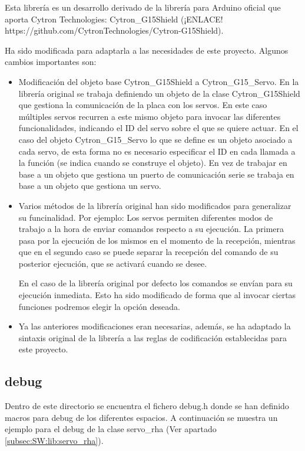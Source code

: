         Esta librería es un desarrollo derivado de la librería para Arduino oficial que aporta Cytron Technologies: Cytron_G15Shield (¡ENLACE! https://github.com/CytronTechnologies/Cytron-G15Shield).

        Ha sido modificada para adaptarla a las necesidades de este proyecto. Algunos cambios importantes son:

        \begin{itemize}
            \item Modificación del objeto base Cytron_G15Shield a Cytron_G15_Servo. En la librería original se trabaja definiendo un objeto de la clase Cytron_G15Shield que gestiona la comunicación de la placa con los servos. En este caso múltiples servos recurren a este mismo objeto para invocar las diferentes funcionalidades, indicando el ID del servo sobre el que se quiere actuar. En el caso del objeto Cytron_G15_Servo lo que se define es un objeto asociado a cada servo, de esta forma no es necesario especificar el ID en cada llamada a la función (se indica cuando se construye el objeto). En vez de trabajar en base a un objeto que gestiona un puerto de comunicación serie se trabaja en base a un objeto que gestiona un servo.
            \item Varios métodos de la librería original han sido modificados para generalizar su funcinalidad. Por ejemplo:
                Los servos permiten diferentes modos de trabajo a la hora de enviar comandos respecto a su ejecución. La primera pasa por la ejecución de los mismos en el momento de la recepción, mientras que en el segundo caso se puede separar la recepción del comando de su posterior ejecución, que se activará cuando se desee.

                En el caso de la librería original por defecto los comandos se envían para su ejecución inmediata. Esto ha sido modificado de forma que al invocar ciertas funciones podremos elegir la opción deseada.
            \item Ya las anteriores modificaciones eran necesarias, además, se ha adaptado la sintaxis original de la librería a las reglas de codificación establecidas para este proyecto.
        \end{itemize}

    \subsection{debug} \label{subsec:SW:lib:debug}
        Dentro de este directorio se encuentra el fichero debug.h donde se han definido macros para debug de los diferentes espacios. A continuación se muestra un ejemplo para el debug de la clase servo_rha (Ver apartado \ref{subsec:SW:lib:servo_rha}).


